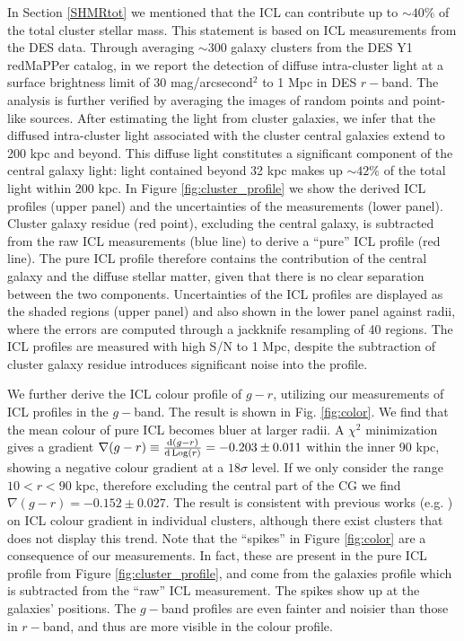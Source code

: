 {In Section \ref{SHMRtot} we mentioned that the ICL can contribute up to $\sim 40\%$ of the total cluster stellar mass. This statement is based on ICL measurements from the DES data. Through averaging $\sim300$ galaxy clusters from the DES Y1 redMaPPer catalog, in \citet{icl} we report the detection of diffuse intra-cluster light at a surface brightness limit of 30 mag/arcsecond$^{2}$ to 1 Mpc in DES $r-$band. The analysis is further verified by averaging the images of random points and point-like sources. After estimating the light from cluster galaxies, we infer that the diffused intra-cluster light associated with the cluster central galaxies extend to 200 kpc and beyond. This diffuse light constitutes a significant component of the central galaxy light: light contained beyond 32 kpc makes up $\sim 42\%$ of the total light within 200 kpc. In Figure \ref{fig:cluster_profile} we show the derived ICL profiles (upper panel) and the uncertainties of the measurements (lower panel). Cluster galaxy residue (red point), excluding the central galaxy, is subtracted from the raw ICL measurements (blue line) to derive a ``pure'' ICL profile (red line). The pure ICL profile therefore contains the contribution of the central galaxy and the diffuse stellar matter, given that there is no clear separation between the two components.  Uncertainties of the ICL profiles are displayed as the shaded regions (upper panel) and also shown in the lower panel against radii, where the errors are computed through a jackknife resampling of 40 regions. The ICL profiles are measured with high S/N to 1 Mpc, despite the subtraction of cluster galaxy residue introduces significant noise into the profile.

We further derive the ICL colour profile of $g-r$, utilizing our measurements of ICL profiles in the $g-$band. The result is shown in Fig. \ref{fig:color}. We find that the mean colour of pure ICL becomes bluer at larger radii. A $\chi^2$ minimization gives a gradient $\nabla (g-r) \equiv \frac{{\rm d} (g-r)}{{\rm d \, Log}(r)}=-0.203\pm 0.011$ within the inner 90 kpc, showing a negative colour gradient at a $18\sigma$ level. If we only consider the range $10<r<90$ kpc, therefore excluding the central part of the CG we find $\nabla (g-r) =-0.152\pm 0.027$. The result is consistent with previous works (e.g. \citealt{demaio}) on ICL colour gradient in individual clusters, although there exist clusters that does not display this trend. Note that the ``spikes'' in Figure \ref{fig:color} are a consequence of our measurements. In fact, these are present in the pure ICL profile from Figure \ref{fig:cluster_profile}, and come from the galaxies profile which is subtracted from the ``raw'' ICL measurement. The spikes show up at the galaxies' positions. The $g-$band profiles are even fainter and noisier than those in $r-$band, and thus are more visible in the colour profile.

}
